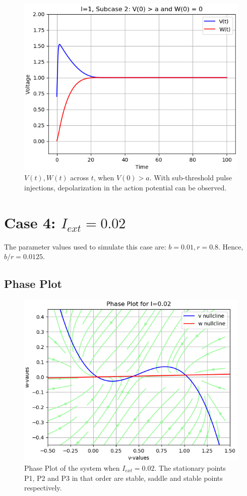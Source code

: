 \documentclass[12pt,a4paper]{article}
\begin{document}
	\begin{figure}[H]
	\centering
	\includegraphics[scale=0.6]{images/Figure_12.png}
	\caption{$V(t), W(t)$ across $t$, when $V(0)>a$. With sub-threshold pulse injections, depolarization in the action potential can be observed.}
	\end{figure}

\section{Case 4: $I_{ext}=0.02$}
The parameter values used to simulate this case are: $b=0.01, r=0.8$. Hence, $b/r = 0.0125$.
\subsection{Phase Plot}
	\begin{figure}[H]
	\centering
	\includegraphics[scale=0.6]{images/Figure_13.png}
	\caption{Phase Plot of the system when $I_{ext} =  0.02$. The stationary points P1, P2 and P3 in that order are stable, saddle and stable points respectively.}
	\end{figure}
\end{document}
